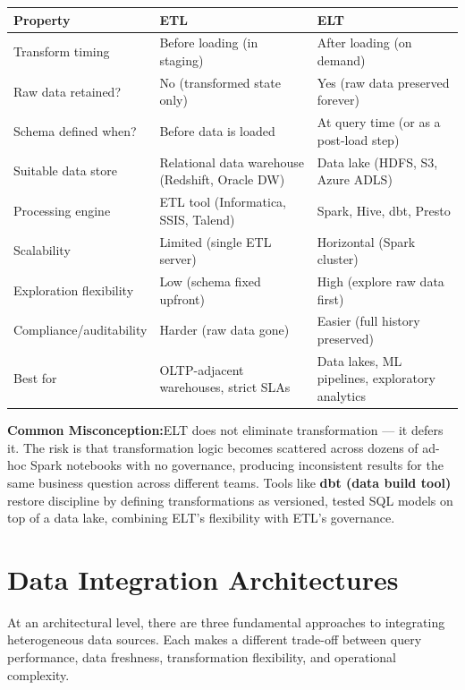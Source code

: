 \documentclass[12pt,a4paper]{article}
\newcommand{\cautionbox}[1]{%
  \noindent
  \colorbox{PURed!10}{%
    \begin{minipage}{\dimexpr\linewidth-2\fboxsep}
      \vspace{4pt}\textcolor{PURed}{\textbf{Common Misconception:}}\;#1
      \vspace{4pt}
    \end{minipage}%
  }\par\vspace{6pt}%
}
\begin{document}
\begin{center}
\renewcommand{\arraystretch}{1.5}
\begin{tabular}{p{3.5cm}p{4.0cm}p{4.5cm}}
  \toprule
  \textbf{Property} & \textbf{ETL} & \textbf{ELT} \\
  \midrule
  Transform timing & Before loading (in staging) & After loading (on demand) \\
  Raw data retained? & No (transformed state only) & Yes (raw data preserved forever) \\
  Schema defined when? & Before data is loaded & At query time (or as a post-load step) \\
  Suitable data store & Relational data warehouse (Redshift, Oracle DW) & Data lake (HDFS, S3, Azure ADLS) \\
  Processing engine & ETL tool (Informatica, SSIS, Talend) & Spark, Hive, dbt, Presto \\
  Scalability & Limited (single ETL server) & Horizontal (Spark cluster) \\
  Exploration flexibility & Low (schema fixed upfront) & High (explore raw data first) \\
  Compliance/auditability & Harder (raw data gone) & Easier (full history preserved) \\
  Best for & OLTP-adjacent warehouses, strict SLAs & Data lakes, ML pipelines, exploratory analytics \\
  \bottomrule
\end{tabular}
\end{center}

\cautionbox{ELT does not eliminate transformation --- it defers it.  The risk is that transformation logic becomes scattered across dozens of ad-hoc Spark notebooks with no governance, producing inconsistent results for the same business question across different teams.  Tools like \textbf{dbt (data build tool)} restore discipline by defining transformations as versioned, tested SQL models on top of a data lake, combining ELT's flexibility with ETL's governance.}

\section{Data Integration Architectures}

At an architectural level, there are three fundamental approaches to integrating heterogeneous data sources.  Each makes a different trade-off between query performance, data freshness, transformation flexibility, and operational complexity.
\end{document}
